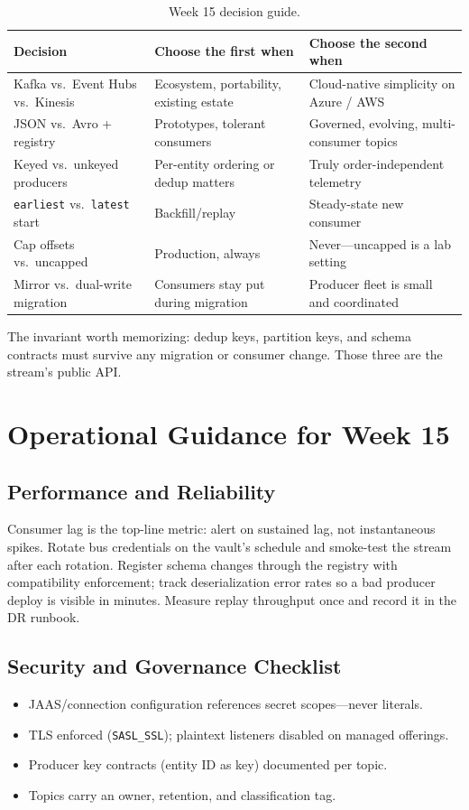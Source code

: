 \begin{table}[H]
\centering
\small
\begin{tabular}{@{}p{3.4cm}p{4.4cm}p{4.6cm}@{}}
\toprule
\textbf{Decision} & \textbf{Choose the first when} & \textbf{Choose the second when} \\
\midrule
Kafka vs.\ Event Hubs vs.\ Kinesis & Ecosystem, portability, existing estate & Cloud-native simplicity on Azure / AWS \\
JSON vs.\ Avro + registry & Prototypes, tolerant consumers & Governed, evolving, multi-consumer topics \\
Keyed vs.\ unkeyed producers & Per-entity ordering or dedup matters & Truly order-independent telemetry \\
\texttt{earliest} vs.\ \texttt{latest} start & Backfill/replay & Steady-state new consumer \\
Cap offsets vs.\ uncapped & Production, always & Never---uncapped is a lab setting \\
Mirror vs.\ dual-write migration & Consumers stay put during migration & Producer fleet is small and coordinated \\
\bottomrule
\end{tabular}
\caption{Week 15 decision guide.}
\label{tab:ch15-decisions}
\end{table}

The invariant worth memorizing: dedup keys, partition keys, and schema contracts must survive any migration or consumer change. Those three are the stream's public API.

\section{Operational Guidance for Week 15}
%
\subsection{Performance and Reliability}
Consumer lag is the top-line metric: alert on sustained lag, not instantaneous spikes. Rotate bus credentials on the vault's schedule and smoke-test the stream after each rotation. Register schema changes through the registry with compatibility enforcement; track deserialization error rates so a bad producer deploy is visible in minutes. Measure replay throughput once and record it in the DR runbook.

\subsection{Security and Governance Checklist}
\begin{itemize}
    \item JAAS/connection configuration references secret scopes---never literals.
    \item TLS enforced (\texttt{SASL\_SSL}); plaintext listeners disabled on managed offerings.
    \item Producer key contracts (entity ID as key) documented per topic.
    \item Topics carry an owner, retention, and classification tag.
\end{itemize}

